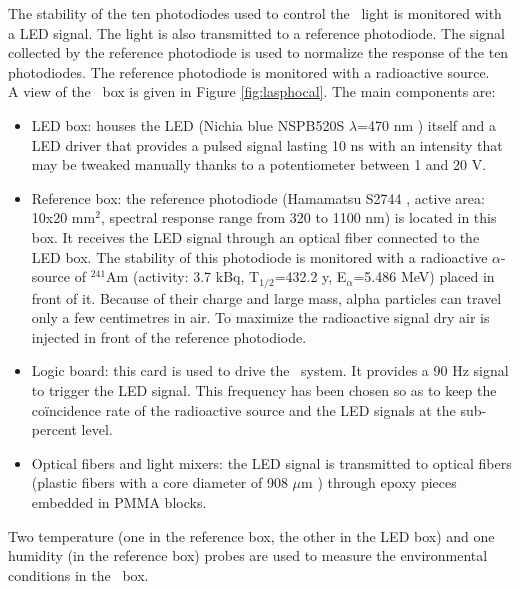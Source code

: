 The stability of the ten photodiodes used to control the \laser~light is monitored with a LED signal. The light is also transmitted to a reference photodiode. The signal collected by the reference photodiode is used to normalize the response of the ten photodiodes. The reference photodiode is monitored with a radioactive source.\\
A view of the \phocal~box is given in Figure \ref{fig:lasphocal}. The main components are:
\begin{itemize}
\item LED box: houses the LED (Nichia blue NSPB520S $\lambda$=470 nm \cite{ref:led}) itself and a LED driver that provides a pulsed signal lasting 10 ns with an intensity that may be tweaked manually thanks to a potentiometer between 1 and 20 V.
\item Reference box: the reference photodiode (Hamamatsu S2744 \cite{ref:bigphoto}, active area: 10x20 mm$^2$,  spectral response range from 320 to 1100 nm) is located in this box. It receives the LED signal through an optical fiber connected to the LED box. The stability of this photodiode is monitored with a radioactive $\alpha$-source of $^{241}$Am (activity: 3.7 kBq, T$_{1/2}$=432.2 y, E$_{\alpha}$=5.486 MeV) placed in front of it. Because of their charge and large mass, alpha particles can travel only a few centimetres in air. To maximize the radioactive signal dry air is injected in front of the reference photodiode.
\item Logic board: this card is used to drive the \phocal~system. It provides a 90 Hz signal to trigger the LED signal. This frequency has been chosen so as to keep the coïncidence rate of the radioactive source and the LED signals at the sub-percent level.
\item Optical fibers and light mixers: the LED signal is transmitted to optical fibers (plastic fibers with a core diameter of 908 $\mu$m \cite{ref:fibers}) through epoxy pieces embedded in PMMA blocks.
\end{itemize}
Two temperature (one in the reference box, the other in the LED box) and one humidity (in the reference box) probes are used to measure the environmental conditions in the \phocal~box. 

